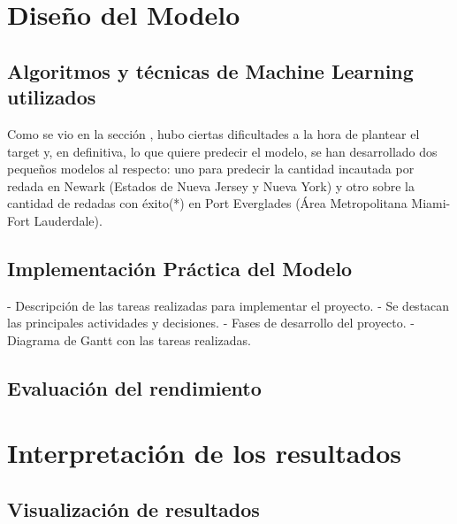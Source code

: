 \documentclass{article}
\begin{document}
\section{Diseño del Modelo}
	\subsection{Algoritmos y técnicas de Machine Learning utilizados}
	
	
	Como se vio en la sección \cite[]{}, hubo ciertas dificultades a la hora de plantear el target y, en definitiva, lo que quiere predecir el modelo, se han desarrollado dos pequeños modelos al respecto: uno para predecir la cantidad incautada por redada en Newark (Estados de Nueva Jersey y Nueva York) y otro sobre la cantidad de redadas con éxito(*) en Port Everglades (Área Metropolitana Miami-Fort Lauderdale).
	
	
	
	

	\subsection{Implementación Práctica del Modelo}
 	- Descripción de las tareas realizadas para implementar el proyecto.
 	- Se destacan las principales actividades y decisiones.
 	- Fases de desarrollo del proyecto.
 	- Diagrama de Gantt con las tareas realizadas.



	\subsection{Evaluación del rendimiento}

\section{Interpretación de los resultados}

	\subsection{Visualización de resultados}
	
\end{document}
